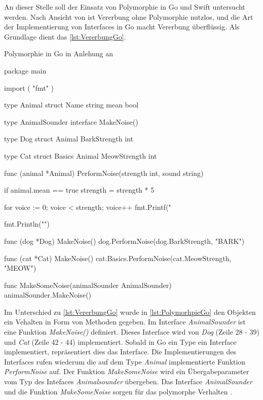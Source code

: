 An dieser Stelle soll der Einsatz von Polymorphie in Go und Swift untersucht werden. 
Nach Ansicht von \cite[]{WilliamKennedy.2013} ist Vererbung ohne Polymorphie nutzlos, und die Art der Implementierung von Interfaces in Go macht Vererbung überflüssig. 
Als Grundlage dient das \autoref{lst:VererbungGo}. 

\begin{listing}[H]
\caption{Polymorphie in Go in Anlehung an \cite[]{WilliamKennedy.2013}}
\label{lst:PolymorhpieGo}
\begin{GoCode}
package main

import (
    "fmt"
)

type Animal struct {
    Name string
    mean bool
}

type AnimalSounder interface {
    MakeNoise()
}

type Dog struct {
    Animal
    BarkStrength int
}

type Cat struct {
    Basics Animal
    MeowStrength int
}

func (animal *Animal) PerformNoise(strength int, sound string) {
    if animal.mean == true {
        strength = strength * 5
    }

    for voice := 0; voice < strength; voice++ {
        fmt.Printf("%
    }

    fmt.Println("")
}

func (dog *Dog) MakeNoise() {
    dog.PerformNoise(dog.BarkStrength, "BARK")
}

func (cat *Cat) MakeNoise() {
    cat.Basics.PerformNoise(cat.MeowStrength, "MEOW")
}

func MakeSomeNoise(animalSounder AnimalSounder) {
    animalSounder.MakeNoise()
}
\end{GoCode}
\end{listing}

Im Unterschied zu \autoref{lst:VererbungGo} wurde in \autoref{lst:PolymorhpieGo} den Objekten ein Vehalten in Form von Methoden gegeben.
Im Interface \emph{AnimalSounder} ist eine Funktion \emph{MakeNoise()} definiert. 
Dieses Interface wird von \emph{Dog} (Zeile 28 - 39) und \emph{Cat} (Zeile 42 - 44) implementiert. 
Sobald in Go ein Type ein Interface implementiert, repräsentiert dies das Interface. 
Die Implementierungen des Interfaces rufen wiederum die auf dem Type \emph{Animal} implementierte Funktion \emph{PerformNoise} auf.
Der Funktion \emph{MakeSomeNoise} wird ein Übergabeparameter vom Typ des Intefaces \emph{Animalsounder} übergeben. 
Das Interface \emph{AnimalSounder} und die Funktion \emph{MakeSomeNoise} sorgen für das polymorphe Verhalten \cite[]{WilliamKennedy.2013}.  

